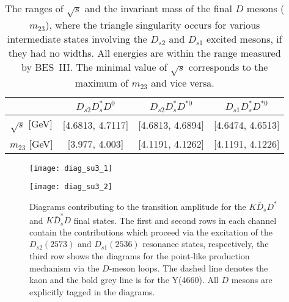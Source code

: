 \documentclass[preprint,12pt,3p]{elsarticle}
\begin{document}
\begin{table}[t]
\begin{center}
\begin{tabular}{|c|c|c|c|}
\hline 
$\,$ & $D_{s2}D_s^*D^0$& $D_{s2}D_s^*D^{*0}$ & $D_{s1}D_s^*D^{*0}$ \\
\hline 
$\sqrt{s}$ [GeV]& [4.6813, 4.7117] & [4.6813, 4.6894] & [4.6474, 4.6513]\\
\hline
$m_{23}$ [GeV]& [3.977, 4.003] & [4.1191, 4.1262] & [4.1191, 4.1226]\\
\hline
\end{tabular}
\end{center}
\caption{The ranges of $\sqrt{s}$ and the invariant mass of the final $D$ mesons ($m_{23}$), where the triangle singularity occurs for various intermediate states involving the $D_{s2}$ and $D_{s1}$ excited mesons, if they had no widths. All energies are within the range measured by BES~III. The minimal value of $\sqrt{s}$ corresponds to the maximum of $m_{23}$ and vice versa.}\label{tableII_triangle_range}
\end{table}

\begin{figure}[t]
\centerline{\texttt{[image: diag\_su3\_1]}}\vspace*{0.4cm}
\centerline{\texttt{[image: diag\_su3\_2]}}
\caption{Diagrams contributing to the transition amplitude for the $K\bar{D}_s D^*$ and $K\bar{D}_s^* D$ final states. The first and second rows in each channel contain the contributions which proceed via the excitation of the $D_{s2}(2573)$ and $D_{s1}(2536)$ resonance states, respectively, the third row shows the diagrams for the point-like production mechanism via the $D$-meson loops. The dashed line denotes the kaon and the bold grey line is for the Y(4660). All $D$ mesons are explicitly tagged in the diagrams. \label{fig:diag} }
\end{figure}
\end{document}
